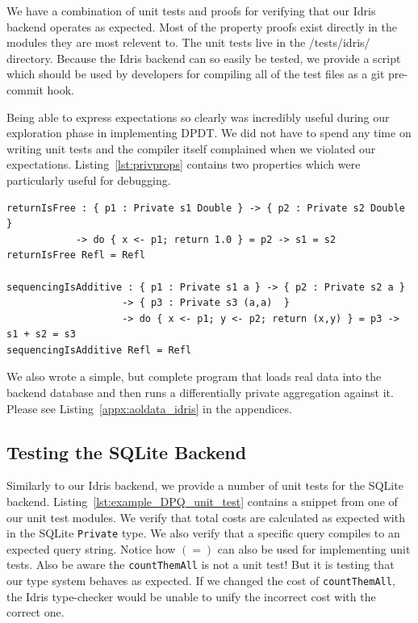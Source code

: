 \documentclass[12pt]{report}
\begin{document}
We have a combination of unit tests and proofs for verifying that our Idris backend operates as expected.
Most of the property proofs exist directly in the modules they are most relevent to.
The unit tests live in the /tests/idris/ directory.
Because the Idris backend can so easily be tested, we provide a script which should be used by developers for compiling all of the test files as a git pre-commit hook.

Being able to express expectations so clearly was incredibly useful during our exploration phase in implementing DPDT.
We did not have to spend any time on writing unit tests and the compiler itself complained when we violated our expectations.
Listing~\ref{lst:privprops} contains two properties which were particularly useful for debugging.

\begin{lstlisting}[float,caption={Properties of \texttt{Private} computation sequencing},label={lst:privprops}]
returnIsFree : { p1 : Private s1 Double } -> { p2 : Private s2 Double }
            -> do { x <- p1; return 1.0 } = p2 -> s1 = s2
returnIsFree Refl = Refl

sequencingIsAdditive : { p1 : Private s1 a } -> { p2 : Private s2 a }
                    -> { p3 : Private s3 (a,a)  }
                    -> do { x <- p1; y <- p2; return (x,y) } = p3 -> s1 + s2 = s3
sequencingIsAdditive Refl = Refl
\end{lstlisting}

We also wrote a simple, but complete program that loads real data into the backend database and then runs a differentially private aggregation against it.
Please see Listing~\ref{appx:aoldata_idris} in the appendices.

\subsection{Testing the SQLite Backend}

Similarly to our Idris backend, we provide a number of unit tests for the SQLite backend.
Listing~\ref{lst:example_DPQ_unit_test} contains a snippet from one of our unit test modules.
We verify that total costs are calculated as expected with in the SQLite \texttt{Private} type.
We also verify that a specific query compiles to an expected query string.
Notice how $(=)$ can also be used for implementing unit tests.
Also be aware the \texttt{countThemAll} is not a unit test!
But it is testing that our type system behaves as expected.
If we changed the cost of \texttt{countThemAll}, the Idris type-checker would be unable to unify the incorrect cost with the correct one.
\end{document}
